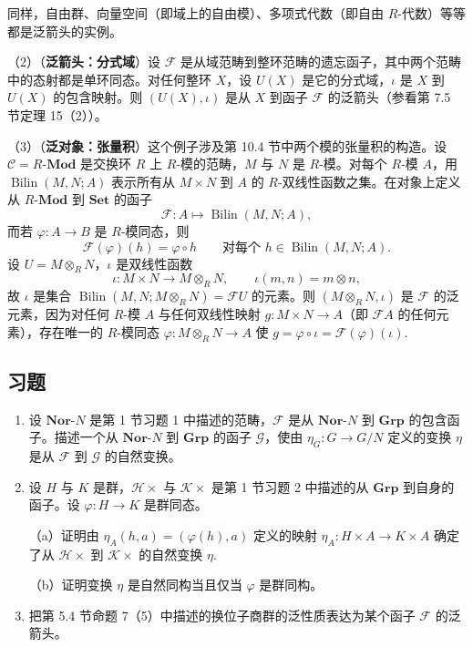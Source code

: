 同样，自由群、向量空间（即域上的自由模）、多项式代数（即自由 \(R\)-代数）等等都是泛箭头的实例。

（2）（\textbf{泛箭头：分式域}）设 \(\mathcal{F}\) 是从域范畴到整环范畴的遗忘函子，其中两个范畴中的态射都是单环同态。对任何整环 \(X\)，设 \(U(X)\) 是它的分式域，\(\iota\) 是 \(X\) 到 \(U(X)\) 的包含映射。则 \((U(X), \iota)\) 是从 \(X\) 到函子 \(\mathcal{F}\) 的泛箭头（参看第 7.5 节定理 15（2））。

（3）（\textbf{泛对象：张量积}）这个例子涉及第 10.4 节中两个模的张量积的构造。设 \(\mathcal{C} = R\text{-}\mathbf{Mod}\) 是交换环 \(R\) 上 \(R\)-模的范畴，\(M\) 与 \(N\) 是 \(R\)-模。对每个 \(R\)-模 \(A\)，用 \(\operatorname{Bilin}(M, N; A)\) 表示所有从 \(M \times N\) 到 \(A\) 的 \(R\)-双线性函数之集。在对象上定义从 \(R\text{-}\mathbf{Mod}\) 到 \(\mathbf{Set}\) 的函子
\[
\mathcal{F} : A \mapsto \operatorname{Bilin}(M, N; A),
\]
而若 \(\varphi : A \to B\) 是 \(R\)-模同态，则
\[
\mathcal{F}(\varphi)(h) = \varphi \circ h \qquad \text{对每个 } h \in \operatorname{Bilin}(M, N; A).
\]
设 \(U = M \otimes_R N\)，\(\iota\) 是双线性函数
\[
\iota : M \times N \to M \otimes_R N, \qquad \iota(m, n) = m \otimes n,
\]
故 \(\iota\) 是集合 \(\operatorname{Bilin}(M, N; M \otimes_R N) = \mathcal{F}U\) 的元素。则 \((M \otimes_R N, \iota)\) 是 \(\mathcal{F}\) 的泛元素，因为对任何 \(R\)-模 \(A\) 与任何双线性映射 \(g : M \times N \to A\)（即 \(\mathcal{F}A\) 的任何元素），存在唯一的 \(R\)-模同态 \(\varphi : M \otimes_R N \to A\) 使 \(g = \varphi \circ \iota = \mathcal{F}(\varphi)(\iota)\).

\subsection*{习题}

\begin{enumerate}
\item 设 \(\mathbf{Nor}\text{-}N\) 是第 1 节习题 1 中描述的范畴，\(\mathcal{F}\) 是从 \(\mathbf{Nor}\text{-}N\) 到 \(\mathbf{Grp}\) 的包含函子。描述一个从 \(\mathbf{Nor}\text{-}N\) 到 \(\mathbf{Grp}\) 的函子 \(\mathcal{G}\)，使由 \(\eta_G : G \to G/N\) 定义的变换 \(\eta\) 是从 \(\mathcal{F}\) 到 \(\mathcal{G}\) 的自然变换。

\item 设 \(H\) 与 \(K\) 是群，\(\mathcal{H}\times\) 与 \(\mathcal{K}\times\) 是第 1 节习题 2 中描述的从 \(\mathbf{Grp}\) 到自身的函子。设 \(\varphi : H \to K\) 是群同态。

（a）证明由 \(\eta_A(h, a) = (\varphi(h), a)\) 定义的映射 \(\eta_A : H \times A \to K \times A\) 确定了从 \(\mathcal{H}\times\) 到 \(\mathcal{K}\times\) 的自然变换 \(\eta\).

（b）证明变换 \(\eta\) 是自然同构当且仅当 \(\varphi\) 是群同构。

\item 把第 5.4 节命题 7（5）中描述的换位子商群的泛性质表达为某个函子 \(\mathcal{F}\) 的泛箭头。
\end{enumerate}
